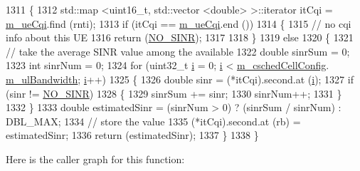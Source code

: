\begin{DoxyCode}
1311 \{
1312   std::map <uint16\_t, std::vector <double> >::iterator itCqi = \hyperlink{classns3_1_1TdMtFfMacScheduler_a586af40d969e8daa42c28b96a67b5854}{m\_ueCqi}.find (rnti);
1313   \textcolor{keywordflow}{if} (itCqi == \hyperlink{classns3_1_1TdMtFfMacScheduler_a586af40d969e8daa42c28b96a67b5854}{m\_ueCqi}.end ())
1314     \{
1315       \textcolor{comment}{// no cqi info about this UE}
1316       \textcolor{keywordflow}{return} (\hyperlink{cqa-ff-mac-scheduler_8h_a520d71777be043568160c783a9c65fd5}{NO\_SINR});
1317 
1318     \}
1319   \textcolor{keywordflow}{else}
1320     \{
1321       \textcolor{comment}{// take the average SINR value among the available}
1322       \textcolor{keywordtype}{double} sinrSum = 0;
1323       \textcolor{keywordtype}{int} sinrNum = 0;
1324       \textcolor{keywordflow}{for} (uint32\_t \hyperlink{bernuolliDistribution_8m_a6f6ccfcf58b31cb6412107d9d5281426}{i} = 0; \hyperlink{bernuolliDistribution_8m_a6f6ccfcf58b31cb6412107d9d5281426}{i} < \hyperlink{classns3_1_1TdMtFfMacScheduler_a585412f686e33f49dad1003e5d2216f0}{m\_cschedCellConfig}.
      \hyperlink{structns3_1_1FfMacCschedSapProvider_1_1CschedCellConfigReqParameters_a5ab5b102878e6e7e7727a14af4a64d2f}{m\_ulBandwidth}; \hyperlink{bernuolliDistribution_8m_a6f6ccfcf58b31cb6412107d9d5281426}{i}++)
1325         \{
1326           \textcolor{keywordtype}{double} sinr = (*itCqi).second.at (\hyperlink{bernuolliDistribution_8m_a6f6ccfcf58b31cb6412107d9d5281426}{i});
1327           \textcolor{keywordflow}{if} (sinr != \hyperlink{cqa-ff-mac-scheduler_8h_a520d71777be043568160c783a9c65fd5}{NO\_SINR})
1328             \{
1329               sinrSum += sinr;
1330               sinrNum++;
1331             \}
1332         \}
1333       \textcolor{keywordtype}{double} estimatedSinr = (sinrNum > 0) ? (sinrSum / sinrNum) : DBL\_MAX;
1334       \textcolor{comment}{// store the value}
1335       (*itCqi).second.at (rb) = estimatedSinr;
1336       \textcolor{keywordflow}{return} (estimatedSinr);
1337     \}
1338 \}
\end{DoxyCode}


Here is the caller graph for this function\+:


